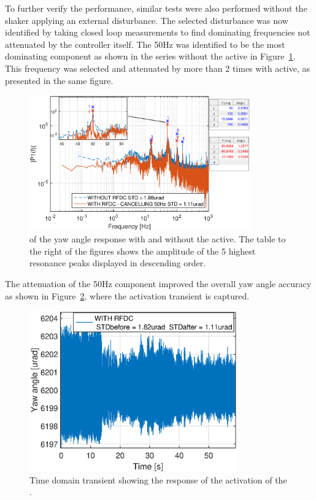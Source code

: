 To further verify the performance, similar tests were also performed without the shaker applying an external disturbance. The selected disturbance was now identified by taking closed loop measurements to find dominating frequencies not attenuated by the controller itself. The 50Hz was identified to be the most dominating component as shown in the series without the \abbrRFDC active in Figure~\ref{fig:fft_closedloop_50}. This frequency was selected and attenuated by more than 2 times with \abbrRFDC active, as presented in the same figure.

\begin{figure}[h]
  \centering %
  \includegraphics[width=0.85\textwidth]{fig/matlab/fft_closedloop_50Hz}
  \caption{\label{fig:fft_closedloop_50}\abbrFFT of the yaw angle response with and without the \abbrRFDC active. The table to the right of the figures shows the amplitude of the 5 highest resonance peaks displayed in descending order.}
\end{figure}

The attenuation of the 50Hz component improved the overall yaw angle accuracy as shown in Figure~\ref{fig:transient_closedloop_50}, where the activation transient is captured.
\FloatBarrier
\begin{figure}[h]
  \centering %
  \includegraphics[width=0.8\textwidth]{fig/matlab/transient_closedloop_50Hz}
  \caption{\label{fig:transient_closedloop_50}Time domain transient showing the response of the activation of the \abbrRFDC.}
\end{figure}


